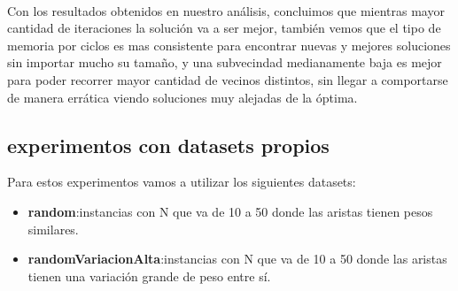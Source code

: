 \documentclass[10pt,a4paper]{article}
\begin{document}
\\
Con los resultados obtenidos en nuestro análisis, concluimos que mientras mayor cantidad de iteraciones la solución va a ser mejor, también vemos que el tipo de memoria por ciclos es mas consistente para encontrar nuevas y mejores soluciones sin importar mucho su tamaño, y una subvecindad medianamente baja es mejor para poder recorrer mayor cantidad de vecinos distintos, sin llegar a comportarse de manera errática viendo soluciones muy alejadas de la óptima.

\subsection{experimentos con datasets propios}
Para estos experimentos vamos a utilizar los siguientes datasets:
\begin{itemize}
\setlength{\itemsep}{1pt}
\setlength{\parskip}{0pt}
 \setlength{\parsep}{0pt}
    
\item \textbf{random}:instancias con N que va de 10 a 50 donde las aristas tienen pesos similares.
\item \textbf{randomVariacionAlta}:instancias con N que va de 10 a 50 donde las aristas tienen una variación grande de peso entre sí.

\end{itemize}
\end{document}
